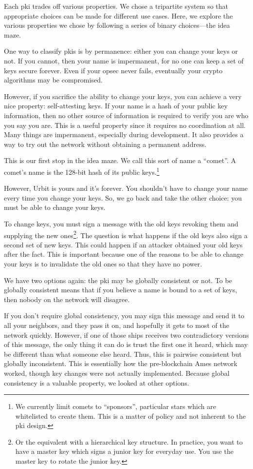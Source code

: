 \documentclass[twoside]{article}
\begin{document}
Each {\sc pki} trades off various properties. We chose a tripartite system so
that appropriate choices can be made for different use cases. Here, we
explore the various properties we chose by following a series of binary
choices—the idea maze.

One way to classify {\sc pki}s is by permanence: either you can change your keys or not. If
you cannot, then your name is impermanent, for no one can keep a set of
keys secure forever. Even if your opsec never fails, eventually your
crypto algorithms may be compromised.

However, if you sacrifice the ability to change your keys, you can achieve
a very nice property: self-attesting keys. If your name is a hash of
your public key information, then no other source of information is
required to verify you are who you say you are. This is a useful
property since it requires no coordination at all. Many things are
impermanent, especially during development. It also provides a way to
try out the network without obtaining a permanent address.

This is our first stop in the idea maze. We call this sort of name a
``comet''. A comet's name is the 128-bit hash of its public keys.\footnote{We currently limit comets to ``sponsors'', particular stars which are whitelisted to create them.  This is a matter of policy and not inherent to the {\sc pki} design.}

However, Urbit is yours and it's forever. You shouldn't have to change
your name every time you change your keys. So, we go back and take the
other choice: you must be able to change your keys.

To change keys, you must sign a message with the old keys revoking them
and supplying the new
ones\footnote{Or the equivalent with a hierarchical key structure. In practice, you
want to have a master key which signs a junior key for everyday use.
You use the master key to rotate the junior
key.}. The question is what
happens if the old keys also sign a second set of new keys. This could
happen if an attacker obtained your old keys after the fact. This is
important because one of the reasons to be able to change your keys is
to invalidate the old ones so that they have no power.

We have two options again: the {\sc pki} may be globally consistent or not. To
be globally consistent means that if you believe a name is bound to a
set of keys, then nobody on the network will disagree.

If you don't require global consistency, you may sign this message and
send it to all your neighbors, and they pass it on, and hopefully it
gets to most of the network quickly. However, if one of those ships
receives two contradictory versions of this message, the only thing it
can do is trust the first one it heard, which may be different than what
someone else heard. Thus, this is pairwise consistent but globally
inconsistent. This is essentially how the pre-blockchain Ames network
worked, though key changes were not actually implemented. Because global
consistency is a valuable property, we looked at other options.
\end{document}
